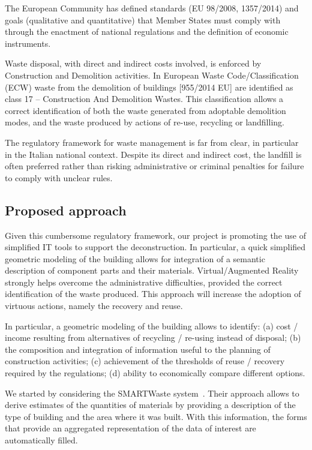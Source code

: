 \documentclass[a4paper,twoside]{article}
\begin{document}
\noindent
The European Community has defined standards (EU 98/2008, 1357/2014) and goals (qualitative and quantitative) that Member States must comply with through the enactment of national regulations and the definition of economic instruments.

Waste disposal, with direct and indirect costs involved, is enforced by Construction and Demolition activities. In European Waste Code/Classification (ECW) waste from the demolition of buildings [955/2014 EU] are identified as class 17 -- Construction And Demolition Wastes.
This classification allows a correct identification of both the waste generated from adoptable demolition modes, and the waste produced by actions of re-use, recycling or landfilling.
 
The regulatory framework for waste management is far from clear, in particular in the Italian national context. Despite its direct and indirect cost, the landfill is often preferred rather than risking administrative or criminal penalties for failure to comply with unclear rules.

\subsection{Proposed approach}

\noindent
Given this cumbersome regulatory framework, our project is promoting the use of simplified IT tools to support the deconstruction. In particular, a quick simplified geometric modeling of the building allows for integration of a semantic description of component parts and their materials. Virtual/Augmented Reality  strongly helps overcome the administrative difficulties, provided the correct identification of the waste produced.
This approach will increase the adoption of virtuous actions, namely the recovery and reuse.

In particular, a  geometric modeling of the building allows to identify:
(a) cost / income resulting from alternatives of recycling / re-using instead of disposal;
(b) the composition and integration of information useful to the planning of construction activities;
(c) achievement of the thresholds of reuse / recovery required by the regulations;
(d) ability to economically compare different options.

We started by considering the SMARTWaste system~\cite{smartWaste}. Their approach allows to derive estimates of the quantities of materials by providing a description of the type of building and the area where it was built. With this information, the forms that provide an aggregated representation of the data of interest are automatically filled.
\end{document}
